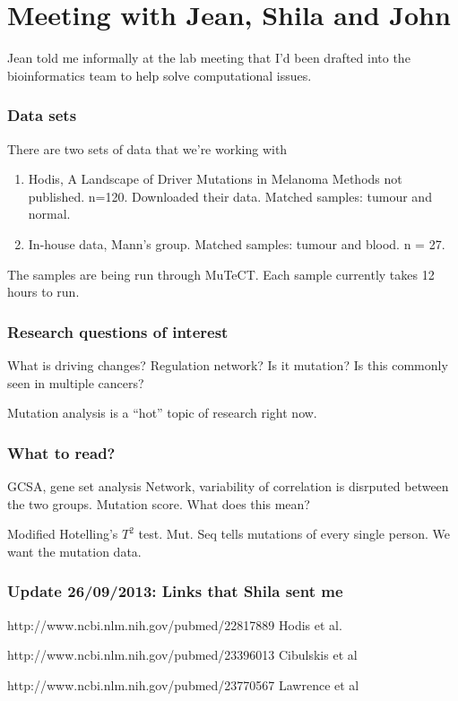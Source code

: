 \documentclass{amsart}
\begin{document}
\part{Meeting with Jean, Shila and John}
Jean told me informally at the lab meeting that I'd been drafted into the bioinformatics team
to help solve computational issues.

\section{Data sets}
There are two sets of data that we're working with
\begin{enumerate}
\item Hodis, A Landscape of Driver Mutations in Melanoma
Methods not published. n=120. Downloaded their data. Matched samples: tumour and normal.
\item In-house data, Mann's group.
Matched samples: tumour and blood. n = 27.
\end{enumerate}

The samples are being run through MuTeCT. Each sample currently takes 12 hours to run.

\section{Research questions of interest}
What is driving changes? Regulation network? Is it mutation? Is this commonly seen in
multiple cancers?

Mutation analysis is a ``hot'' topic of research right now.

\section{What to read?}
GCSA, gene set analysis
Network, variability of correlation is disrputed between the two groups.
Mutation score. What does this mean?

Modified Hotelling's $T^2$ test.
Mut. Seq tells mutations of every single person.
We want the mutation data.

\section{Update 26/09/2013: Links that Shila sent me}
http://www.ncbi.nlm.nih.gov/pubmed/22817889 Hodis et al.

http://www.ncbi.nlm.nih.gov/pubmed/23396013 Cibulskis et al

http://www.ncbi.nlm.nih.gov/pubmed/23770567 Lawrence et al
\end{document}
